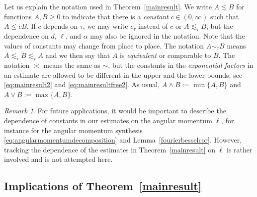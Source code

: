 \documentclass[12pt,reqno]{amsart}
\theoremstyle{definition}
\theoremstyle{remark}
\newtheorem{remark}[theorem]{Remark}
\numberwithin{equation}{section}
\newcommand{\1}{\mathbbm{1}}
\begin{document}
Let us explain the notation used in Theorem~\ref{mainresult}.
We write $A\lesssim B$ for functions $A,B\geq0$ to indicate that there is a \textit{constant} $c\in (0,\infty)$ such that $A\leq c B$. If $c$ depends on $\tau$, we may write $c_\tau$ instead of $c$ or $A\lesssim_\tau\! B$, but the dependence on $d$, $\ell$, and $\alpha$ may also be ignored in the notation. Note that the values of constants may change from place to place. The notation $A\sim_\tau B$ means $A\lesssim_\tau\! B \lesssim_\tau\! A$ and we then say that $A$ is \emph{equivalent} or comparable to $B$.\index{$\lesssim$}\index{$\sim$}
The notation $\asymp$\index{$\asymp$} means the same as $\sim$, but the constants in the \textit{exponential factors} in an estimate are allowed to be different in the upper and the lower bounds; see \eqref{eq:mainresult2} and \eqref{eq:mainresultfree2}. As usual, $A\wedge B:=\min\{A,B\}$ and $A\vee B:=\max\{A,B\}$. \index{$\wedge$}\index{$\vee$} 

\begin{remark}
  For future applications, it would be important to describe the dependence of constants in our estimates on the angular momentum $\ell$, for instance for the angular momentum synthesis \eqref{eq:angularmomentumdecomposition} and Lemma~\ref{fourierbesselcor}. However, tracking the dependence of the estimates in Theorem~\ref{mainresult} on $\ell$ is rather involved and is not attempted here.
\end{remark}



\subsection*{Implications of Theorem~\ref{mainresult}}
\end{document}

